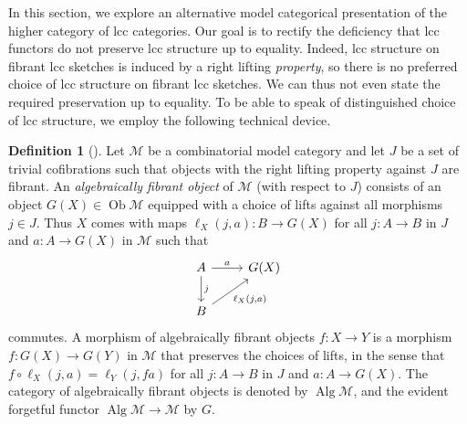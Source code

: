 \documentclass[a4paper]{article}
\theoremstyle{remark}
\theoremstyle{definition}
\newtheorem{definition}[theorem]{Definition}
\begin{document}
In this section, we explore an alternative model categorical presentation of the higher category of lcc categories.
Our goal is to rectify the deficiency that lcc functors do not preserve lcc structure up to equality.
Indeed, lcc structure on fibrant lcc sketches is induced by a right lifting \emph{property}, so there is no preferred choice of lcc structure on fibrant lcc sketches. 
We can thus not even state the required preservation up to equality.
To be able to speak of distinguished choice of lcc structure, we employ the following technical device.
\begin{definition}[\citet{algebraic-models}]
  \label{def:algebraically-fibrant-objects}
  Let $\mathcal{M}$ be a combinatorial model category and let $J$ be a set of trivial cofibrations such that objects with the right lifting property against $J$ are fibrant.
  An \emph{algebraically fibrant object} of $\mathcal{M}$ (with respect to $J$) consists of an object $G(X) \in \operatorname{Ob} \mathcal{M}$ equipped with a choice of lifts against all morphisms $j \in J$.
  Thus $X$ comes with maps $\ell_X({j, a}) : B \rightarrow G(X)$ for all $j : A \rightarrow B$ in $J$ and $a : A \rightarrow G(X)$ in $\mathcal{M}$ such that
  \begin{equation}
    \begin{tikzcd}
      A \arrow[d, "j"] \arrow[r, "a"] & G(X) \\
      B \arrow[ur, "{\ell_X(j, a)}"']
    \end{tikzcd}
  \end{equation}
  commutes.
  A morphism of algebraically fibrant objects $f : X \rightarrow Y$ is a morphism $f : G(X) \rightarrow G(Y)$ in $\mathcal{M}$ that preserves the choices of lifts, in the sense that $f \circ \ell_X(j, a) = \ell_Y(j, fa)$ for all $j : A \rightarrow B$ in $J$ and $a : A \rightarrow G(X)$.
  The category of algebraically fibrant objects is denoted by $\operatorname{Alg} \mathcal{M}$, and the evident forgetful functor $\operatorname{Alg} \mathcal{M} \rightarrow \mathcal{M}$ by $G$.
\end{definition}
\end{document}
